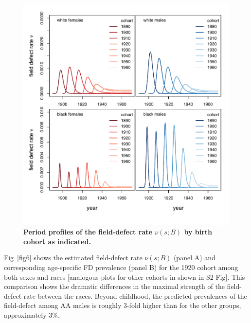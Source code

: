 \documentclass[10pt,letterpaper]{article}
\begin{document}
\begin{figure}[!ht]
\includegraphics[scale=0.8, trim=0 0 0 40]{FEFFrates_SEER9-2016_panel.pdf}
\caption{{\bf Period profiles of the field-defect rate $\nu(s;B)$ by birth cohort as indicated.}}
\label{fig5}
\end{figure}

Fig~\ref{fig6} shows the estimated field-defect rate $\nu(s; B)$ (panel A) and corresponding age-specific FD prevalence (panel B) for the 1920 cohort among both sexes and races [analogous plots for other cohorts in shown in S2 Fig]. This comparison shows the dramatic differences in the maximal strength of the field-defect rate between the races. Beyond childhood, the predicted prevalences of the field-defect among AA males is roughly 3-fold higher than for the other groups, approximately 3$\%$.     
\end{document}
